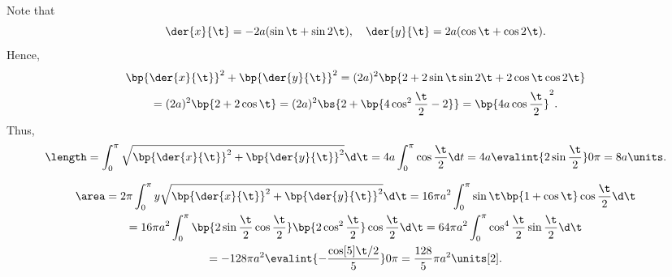 \begin{solution}
\begin{ppart}
\begin{center}
        \end{center}
    \end{ppart}
    \begin{ppart}
        Note that \[\der{x}{\t} = -2a(\sin\t+\sin2\t), \quad \der{y}{\t} = 2a(\cos\t + \cos2\t).\] Hence,
        \begin{gather*}
            \bp{\der{x}{\t}}^2 + \bp{\der{y}{\t}}^2 = (2a)^2 \bp{2 + 2\sin \t \sin 2\t + 2\cos \t \cos 2\t} \\
            = (2a)^2 \bp{2 + 2\cos \t} = (2a)^2 \bs{2 + \bp{4\cos^2 \frac\t2 - 2}} = \bp{4a\cos \frac\t2}^2.
        \end{gather*}
        Thus, \[\length = \int_0^{\pi} \sqrt{\bp{\der{x}{\t}}^2 + \bp{\der{y}{\t}}^2} \d \t = 4a \int_0^\pi \cos \frac\t2 \d t = 4a \evalint{2\sin \frac\t2}0\pi = 8a \units.\]
    \end{ppart}
    \begin{ppart}
        \begin{gather*}
            \area = 2\pi \int_0^\pi y \sqrt{\bp{\der{x}{\t}}^2 + \bp{\der{y}{\t}}^2} \d \t = 16\pi a^2 \int_0^\pi \sin \t \bp{1 + \cos \t} \cos \frac\t2 \d \t\\
            = 16\pi a^2 \int_0^\pi \bp{2\sin\frac\t2 \cos \frac\t2}\bp{2\cos^2 \frac\t2} \cos \frac\t2 \d \t = 64 \pi a^2 \int_0^\pi \cos^4 \frac\t2 \sin \frac\t2 \d \t\\
            = -128\pi a^2 \evalint{-\frac{\cos[5]{\t/2}}5}0\pi = \frac{128}5 \pi a^2 \units[2].
        \end{gather*}
    \end{ppart}
\end{solution}

